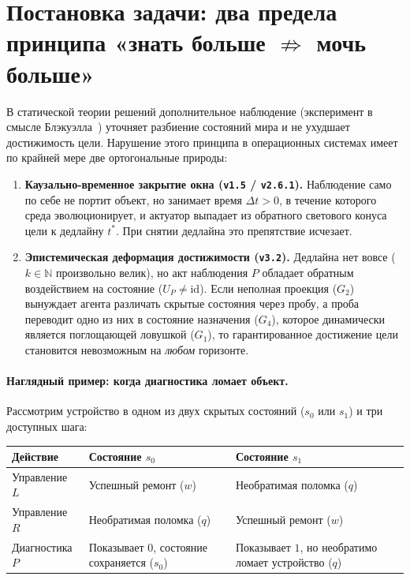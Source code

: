 \documentclass[10pt,a4paper]{article}
\theoremstyle{cleanthm}
\theoremstyle{cleandef}
\begin{document}
\section{Постановка задачи: два предела принципа «знать больше \texorpdfstring{$\not\Rightarrow$}{не влечёт} мочь больше»}

В статической теории решений дополнительное наблюдение (эксперимент в смысле Блэкуэлла~\cite{blackwell1953}) уточняет разбиение состояний мира и не ухудшает достижимость цели. Нарушение этого принципа в операционных системах имеет по крайней мере две ортогональные природы:
\begin{enumerate}
  \item \textbf{Каузально-временное закрытие окна (\texttt{v1.5} / \texttt{v2.6.1}).} Наблюдение само по себе не портит объект, но занимает время $\Delta t>0$, в течение которого среда эволюционирует, и актуатор выпадает из обратного светового конуса цели к дедлайну $t^*$. При снятии дедлайна это препятствие исчезает.
  \item \textbf{Эпистемическая деформация достижимости (\texttt{v3.2}).} Дедлайна нет вовсе ($k\in\mathbb{N}$ произвольно велик), но акт наблюдения $P$ обладает обратным воздействием на состояние ($U_P\ne\mathrm{id}$). Если неполная проекция ($G_2$) вынуждает агента различать скрытые состояния через пробу, а проба переводит одно из них в состояние назначения ($G_4$), которое динамически является поглощающей ловушкой ($G_1$), то гарантированное достижение цели становится невозможным на \emph{любом} горизонте.
\end{enumerate}

\paragraph{Наглядный пример: когда диагностика ломает объект.}
Рассмотрим устройство в одном из двух скрытых состояний ($s_0$ или $s_1$) и три доступных шага:

\begin{table}[!htbp]
\centering
\small
\begin{tabularx}{\linewidth}{@{}>{\raggedright\arraybackslash}p{38mm} >{\raggedright\arraybackslash}X >{\raggedright\arraybackslash}X@{}}
\toprule
\textbf{Действие} & \textbf{Состояние $s_0$} & \textbf{Состояние $s_1$} \\
\midrule
Управление $L$ & Успешный ремонт ($w$) & Необратимая поломка ($q$) \\
Управление $R$ & Необратимая поломка ($q$) & Успешный ремонт ($w$) \\
Диагностика $P$ & Показывает $0$, состояние сохраняется ($s_0$) & Показывает $1$, но необратимо ломает устройство ($q$) \\
\bottomrule
\end{tabularx}
\end{table}
\end{document}
